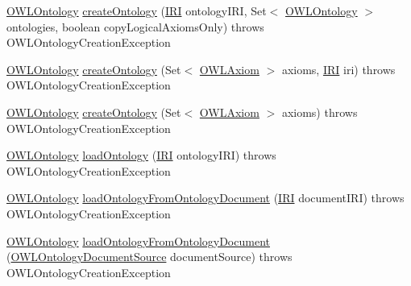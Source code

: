 \begin{DoxyCompactItemize}
\item 
\hyperlink{interfaceorg_1_1semanticweb_1_1owlapi_1_1model_1_1_o_w_l_ontology}{O\-W\-L\-Ontology} \hyperlink{classuk_1_1ac_1_1manchester_1_1cs_1_1owl_1_1owlapi_1_1_o_w_l_ontology_manager_impl_a5f525075ff0031fd964a8cf6602d3d95}{create\-Ontology} (\hyperlink{classorg_1_1semanticweb_1_1owlapi_1_1model_1_1_i_r_i}{I\-R\-I} ontology\-I\-R\-I, Set$<$ \hyperlink{interfaceorg_1_1semanticweb_1_1owlapi_1_1model_1_1_o_w_l_ontology}{O\-W\-L\-Ontology} $>$ ontologies, boolean copy\-Logical\-Axioms\-Only)  throws O\-W\-L\-Ontology\-Creation\-Exception 
\item 
\hyperlink{interfaceorg_1_1semanticweb_1_1owlapi_1_1model_1_1_o_w_l_ontology}{O\-W\-L\-Ontology} \hyperlink{classuk_1_1ac_1_1manchester_1_1cs_1_1owl_1_1owlapi_1_1_o_w_l_ontology_manager_impl_a115bc0e06de99a5f1ab88c160ec55c86}{create\-Ontology} (Set$<$ \hyperlink{interfaceorg_1_1semanticweb_1_1owlapi_1_1model_1_1_o_w_l_axiom}{O\-W\-L\-Axiom} $>$ axioms, \hyperlink{classorg_1_1semanticweb_1_1owlapi_1_1model_1_1_i_r_i}{I\-R\-I} iri)  throws O\-W\-L\-Ontology\-Creation\-Exception 
\item 
\hyperlink{interfaceorg_1_1semanticweb_1_1owlapi_1_1model_1_1_o_w_l_ontology}{O\-W\-L\-Ontology} \hyperlink{classuk_1_1ac_1_1manchester_1_1cs_1_1owl_1_1owlapi_1_1_o_w_l_ontology_manager_impl_a6141a2e7b94c89f4c7ae34fcb84ec000}{create\-Ontology} (Set$<$ \hyperlink{interfaceorg_1_1semanticweb_1_1owlapi_1_1model_1_1_o_w_l_axiom}{O\-W\-L\-Axiom} $>$ axioms)  throws O\-W\-L\-Ontology\-Creation\-Exception 
\item 
\hyperlink{interfaceorg_1_1semanticweb_1_1owlapi_1_1model_1_1_o_w_l_ontology}{O\-W\-L\-Ontology} \hyperlink{classuk_1_1ac_1_1manchester_1_1cs_1_1owl_1_1owlapi_1_1_o_w_l_ontology_manager_impl_aa6a08c94d3e0dd7d578f74e8714211d8}{load\-Ontology} (\hyperlink{classorg_1_1semanticweb_1_1owlapi_1_1model_1_1_i_r_i}{I\-R\-I} ontology\-I\-R\-I)  throws O\-W\-L\-Ontology\-Creation\-Exception 
\item 
\hyperlink{interfaceorg_1_1semanticweb_1_1owlapi_1_1model_1_1_o_w_l_ontology}{O\-W\-L\-Ontology} \hyperlink{classuk_1_1ac_1_1manchester_1_1cs_1_1owl_1_1owlapi_1_1_o_w_l_ontology_manager_impl_a16e09246be30ba69c5a19382be6a28e6}{load\-Ontology\-From\-Ontology\-Document} (\hyperlink{classorg_1_1semanticweb_1_1owlapi_1_1model_1_1_i_r_i}{I\-R\-I} document\-I\-R\-I)  throws O\-W\-L\-Ontology\-Creation\-Exception 
\item 
\hyperlink{interfaceorg_1_1semanticweb_1_1owlapi_1_1model_1_1_o_w_l_ontology}{O\-W\-L\-Ontology} \hyperlink{classuk_1_1ac_1_1manchester_1_1cs_1_1owl_1_1owlapi_1_1_o_w_l_ontology_manager_impl_a6f4b6d44a9b667515c0a0757d9532c77}{load\-Ontology\-From\-Ontology\-Document} (\hyperlink{interfaceorg_1_1semanticweb_1_1owlapi_1_1io_1_1_o_w_l_ontology_document_source}{O\-W\-L\-Ontology\-Document\-Source} document\-Source)  throws O\-W\-L\-Ontology\-Creation\-Exception 

\end{DoxyCompactItemize}
